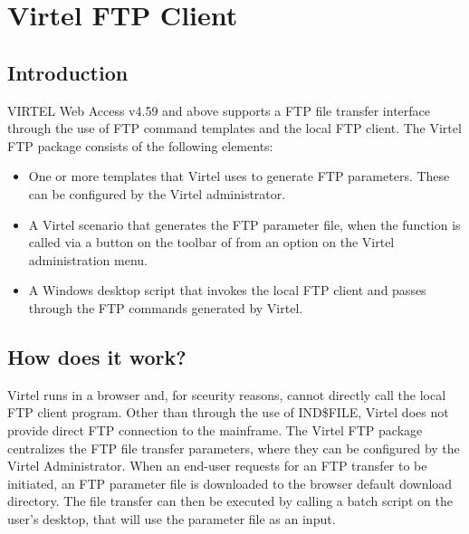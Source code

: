 \documentclass[letterpaper,10pt,english]{sphinxmanual}
\begin{document}
\ignorespaces 

\chapter{Virtel FTP Client}
\label{\detokenize{Customization:virtel-ftp-client}}\label{\detokenize{Customization:index-125}}

\section{Introduction}
\label{\detokenize{Customization:id1}}
VIRTEL Web Access v4.59 and above supports a FTP file transfer interface through the use of FTP command templates and the local FTP client. The Virtel FTP package consists of the following elements:
\begin{itemize}
\item {} 
One or more templates that Virtel uses to generate FTP parameters. These can be configured by the Virtel administrator.

\item {} 
A Virtel scenario that generates the FTP parameter file, when the function is called via a button on the toolbar of from an option on the Virtel administration menu.

\item {} 
A Windows desktop script that invokes the local FTP client and passes through the FTP commands generated by Virtel.

\end{itemize}


\section{How does it work?}
\label{\detokenize{Customization:how-does-it-work}}
Virtel runs in a browser and, for sceurity reasons, cannot directly call the local FTP client program. Other than through the use of IND\$FILE, Virtel does not provide direct FTP connection to the mainframe. The Virtel FTP package centralizes the FTP file transfer parameters, where they can be configured by the Virtel Administrator. When an end-user requests for an FTP transfer to be initiated, an FTP parameter file is downloaded to the browser default download directory. The file transfer can then be executed by calling a batch script on the user’s desktop, that will use the parameter file as an input.
\end{document}

